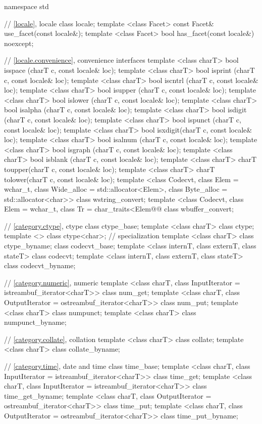 %
\begin{codeblock}
namespace std {
  // \ref{locale}, locale
  class locale;
  template <class Facet> const Facet& use_facet(const locale&);
  template <class Facet> bool         has_facet(const locale&) noexcept;

  // \ref{locale.convenience}, convenience interfaces
  template <class charT> bool isspace (charT c, const locale& loc);
  template <class charT> bool isprint (charT c, const locale& loc);
  template <class charT> bool iscntrl (charT c, const locale& loc);
  template <class charT> bool isupper (charT c, const locale& loc);
  template <class charT> bool islower (charT c, const locale& loc);
  template <class charT> bool isalpha (charT c, const locale& loc);
  template <class charT> bool isdigit (charT c, const locale& loc);
  template <class charT> bool ispunct (charT c, const locale& loc);
  template <class charT> bool isxdigit(charT c, const locale& loc);
  template <class charT> bool isalnum (charT c, const locale& loc);
  template <class charT> bool isgraph (charT c, const locale& loc);
  template <class charT> bool isblank (charT c, const locale& loc);
  template <class charT> charT toupper(charT c, const locale& loc);
  template <class charT> charT tolower(charT c, const locale& loc);
  template <class Codecvt, class Elem = wchar_t,
    class Wide_alloc = std::allocator<Elem>,
    class Byte_alloc = std::allocator<char>> class wstring_convert;
  template <class Codecvt, class Elem = wchar_t,
     class Tr = char_traits<Elem@\shr{}@ class wbuffer_convert;

  // \ref{category.ctype}, ctype
  class ctype_base;
  template <class charT> class ctype;
  template <>            class ctype<char>;             // specialization
  template <class charT> class ctype_byname;
  class codecvt_base;
  template <class internT, class externT, class stateT> class codecvt;
  template <class internT, class externT, class stateT> class codecvt_byname;

  // \ref{category.numeric}, numeric
  template <class charT, class InputIterator = istreambuf_iterator<charT>>  class num_get;
  template <class charT, class OutputIterator = ostreambuf_iterator<charT>> class num_put;
  template <class charT> class numpunct;
  template <class charT> class numpunct_byname;

  // \ref{category.collate}, collation
  template <class charT> class collate;
  template <class charT> class collate_byname;

  // \ref{category.time}, date and time
  class time_base;
  template <class charT, class InputIterator = istreambuf_iterator<charT>>
    class time_get;
  template <class charT, class InputIterator = istreambuf_iterator<charT>>
    class time_get_byname;
  template <class charT, class OutputIterator = ostreambuf_iterator<charT>>
    class time_put;
  template <class charT, class OutputIterator = ostreambuf_iterator<charT>>
    class time_put_byname;

}
\end{codeblock}
